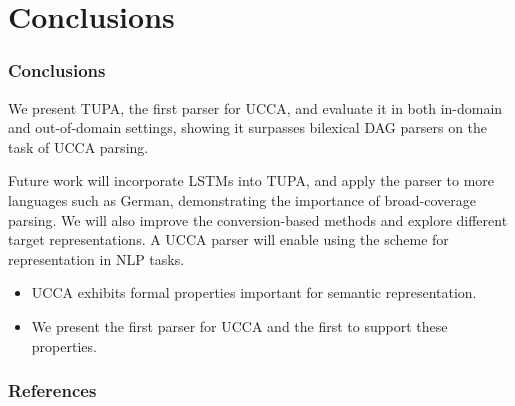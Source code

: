 \documentclass[t]{beamer}
\newcommand{\parser}[1]{TUPA\textsubscript{#1}}
\begin{document}
\section{Conclusions}

\begin{frame}
\frametitle{Conclusions}
We present \parser{}, the first parser for UCCA, and
evaluate it in both in-domain and out-of-domain settings,
showing it surpasses bilexical DAG parsers on the task of UCCA parsing.

Future work will incorporate LSTMs into \parser{},
and apply the parser to more languages such as German,
demonstrating the importance of broad-coverage parsing.
We will also improve the conversion-based methods and explore different target representations.
A UCCA parser will enable using the scheme for representation in NLP tasks.

\begin{itemize}
 \item UCCA exhibits formal properties important for semantic representation.
 \item We present the first parser for UCCA and the first to support these properties.
\end{itemize}
\end{frame}



\begin{frame}
\frametitle{References}
\scriptsize

\end{frame}
\end{document}
